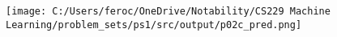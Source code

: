 \begin{answer}
\newline
  \texttt{[image: C:/Users/feroc/OneDrive/Notability/CS229 Machine Learning/problem\_sets/ps1/src/output/p02c\_pred.png]}
\end{answer}
